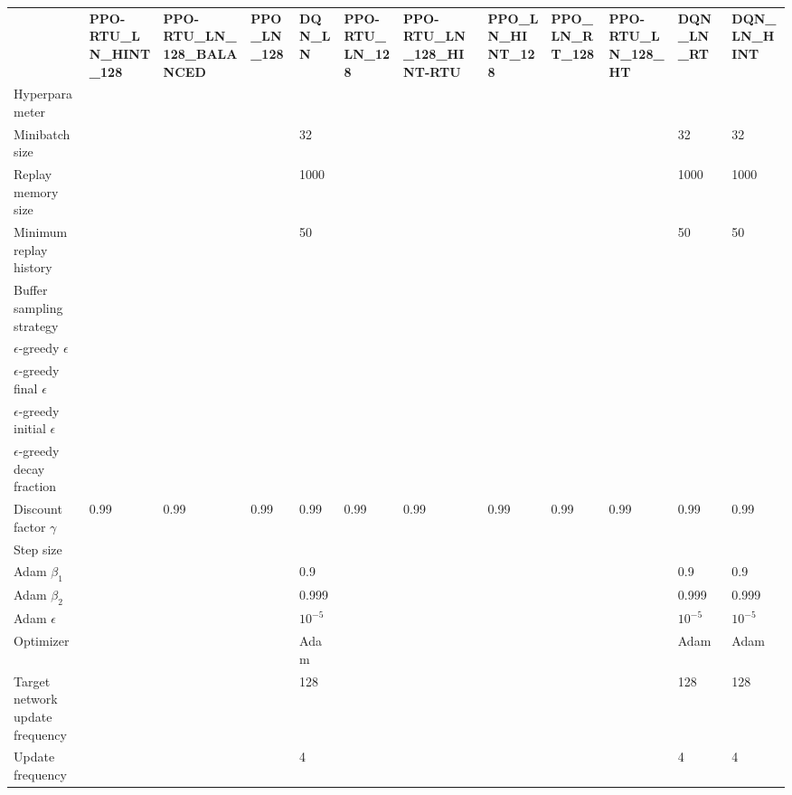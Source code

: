 \begin{tabular}{llllllllllll}
 & \bfseries PPO-RTU_LN_HINT_128 & \bfseries PPO-RTU_LN_128_BALANCED & \bfseries PPO_LN_128 & \bfseries DQN_LN & \bfseries PPO-RTU_LN_128 & \bfseries PPO-RTU_LN_128_HINT-RTU & \bfseries PPO_LN_HINT_128 & \bfseries PPO_LN_RT_128 & \bfseries PPO-RTU_LN_128_HT & \bfseries DQN_LN_RT & \bfseries DQN_LN_HINT \\
Hyperparameter &  &  &  &  &  &  &  &  &  &  &  \\
Minibatch size &  &  &  & 32 &  &  &  &  &  & 32 & 32 \\
Replay memory size &  &  &  & 1000 &  &  &  &  &  & 1000 & 1000 \\
Minimum replay history &  &  &  & 50 &  &  &  &  &  & 50 & 50 \\
Buffer sampling strategy &  &  &  &  &  &  &  &  &  &  &  \\
$\epsilon$-greedy $\epsilon$ &  &  &  &  &  &  &  &  &  &  &  \\
$\epsilon$-greedy final $\epsilon$ &  &  &  &  &  &  &  &  &  &  &  \\
$\epsilon$-greedy initial $\epsilon$ &  &  &  &  &  &  &  &  &  &  &  \\
$\epsilon$-greedy decay fraction &  &  &  &  &  &  &  &  &  &  &  \\
Discount factor $\gamma$ & 0.99 & 0.99 & 0.99 & 0.99 & 0.99 & 0.99 & 0.99 & 0.99 & 0.99 & 0.99 & 0.99 \\
Step size &  &  &  &  &  &  &  &  &  &  &  \\
Adam $\beta_1$ &  &  &  & 0.9 &  &  &  &  &  & 0.9 & 0.9 \\
Adam $\beta_2$ &  &  &  & 0.999 &  &  &  &  &  & 0.999 & 0.999 \\
Adam $\epsilon$ &  &  &  & $10^{-5}$ &  &  &  &  &  & $10^{-5}$ & $10^{-5}$ \\
Optimizer &  &  &  & Adam &  &  &  &  &  & Adam & Adam \\
Target network update frequency &  &  &  & 128 &  &  &  &  &  & 128 & 128 \\
Update frequency &  &  &  & 4 &  &  &  &  &  & 4 & 4 \\
\end{tabular}
